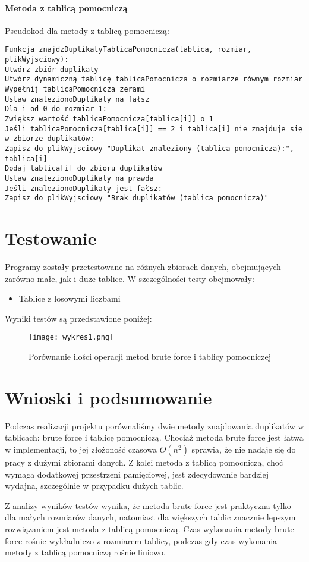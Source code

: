 \documentclass[a4paper,12pt]{article}
\begin{document}
\newpage


\paragraph{Metoda z tablicą pomocniczą}
Pseudokod dla metody z tablicą pomocniczą:
\begin{verbatim}
Funkcja znajdzDuplikatyTablicaPomocnicza(tablica, rozmiar, plikWyjsciowy):
Utwórz zbiór duplikaty
Utwórz dynamiczną tablicę tablicaPomocnicza o rozmiarze równym rozmiar
Wypełnij tablicaPomocnicza zerami
Ustaw znalezionoDuplikaty na fałsz
Dla i od 0 do rozmiar-1:
Zwiększ wartość tablicaPomocnicza[tablica[i]] o 1
Jeśli tablicaPomocnicza[tablica[i]] == 2 i tablica[i] nie znajduje się w zbiorze duplikatów:
Zapisz do plikWyjsciowy "Duplikat znaleziony (tablica pomocnicza):", tablica[i]
Dodaj tablica[i] do zbioru duplikatów
Ustaw znalezionoDuplikaty na prawda
Jeśli znalezionoDuplikaty jest fałsz:
Zapisz do plikWyjsciowy "Brak duplikatów (tablica pomocnicza)"
\end{verbatim}

\section{Testowanie}
Programy zostały przetestowane na różnych zbiorach danych, obejmujących zarówno małe, jak i duże tablice. W szczególności testy obejmowały:
\begin{itemize}
    \item Tablice z losowymi liczbami
    
\end{itemize}

Wyniki testów są przedstawione poniżej:

\begin{figure}[H]
    \centering
    \texttt{[image: wykres1.png]}
    \caption{Porównanie ilości operacji metod brute force i tablicy pomocniczej}
    \label{fig:wykres_testow}
\end{figure}

\newpage


\section{Wnioski i podsumowanie}
Podczas realizacji projektu porównaliśmy dwie metody znajdowania duplikatów w tablicach: brute force i tablicę pomocniczą. Chociaż metoda brute force jest łatwa w implementacji, to jej złożoność czasowa $O(n^2)$ sprawia, że nie nadaje się do pracy z dużymi zbiorami danych. Z kolei metoda z tablicą pomocniczą, choć wymaga dodatkowej przestrzeni pamięciowej, jest zdecydowanie bardziej wydajna, szczególnie w przypadku dużych tablic. 

Z analizy wyników testów wynika, że metoda brute force jest praktyczna tylko dla małych rozmiarów danych, natomiast dla większych tablic znacznie lepszym rozwiązaniem jest metoda z tablicą pomocniczą. Czas wykonania metody brute force rośnie wykładniczo z rozmiarem tablicy, podczas gdy czas wykonania metody z tablicą pomocniczą rośnie liniowo.
\end{document}
